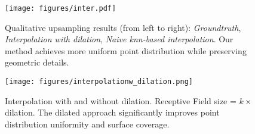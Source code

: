 

\begin{figure}[t]
\small
\centering
\texttt{[image: figures/inter.pdf]}
\vspace{-.1in}
\caption{Qualitative upsampling results (from left to right): \emph{Groundtruth}, \emph{Interpolation with dilation}, \emph{Naive knn-based interpolation}. Our method achieves more uniform point distribution while preserving geometric details.}
\vspace{-.3in}
\label{fig:dila-visual}
\end{figure}

\begin{figure}[t]
\small
\texttt{[image: figures/interpolationw\_dilation.png]}
\caption{Interpolation with and without dilation. Receptive Field size = $k \times$ dilation. The dilated approach significantly improves point distribution uniformity and surface coverage.}
\label{fig:dilation}
\end{figure}


